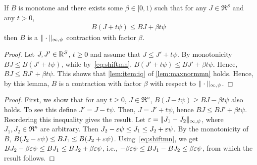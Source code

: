 \documentclass[12pt,draftcls,onecolumn]{IEEEtran}
\begin{document}
\begin{corollary}
\label{maxnormmn}
\label{cor:maxnormmn}
If $B$ is monotone and there exists some $\beta\in [0,1)$ such that for any $J\in \Re^S$ and any $t>0$,
\begin{align}
\label{eq:shiftmn}
B( J + t \psi) \le B J + \beta t \psi
\end{align}
then $B$ is a $\|\cdot\|_{\infty,\psi}$ contraction with factor $\beta$.
\end{corollary}
\begin{proof}
Let $J,J'\in \mathbb{R}^S$, $t\ge 0$ and assume that $J\le J' + t \psi$. By monotonicity $BJ \le B(J'+ t \psi)$, while
by~\eqref{eq:shiftmn}, $B(J'+t\psi) \le BJ' + \beta t \psi$. Hence, $BJ \le BJ' + \beta t \psi$.
This shows that \eqref{lem:item:iq} of \cref{lem:maxnormmn} holds.
Hence, by this lemma, $B$ is a contraction with factor $\beta$ with respect to $\|\cdot\|_{\infty,\psi}$.
\end{proof}
\begin{proof}
First, we show that for any $t\ge 0$,  $J\in \Re^n$,
$B( J - t \psi) \ge B J - \beta t \psi$ also holds.
To see this define $J' = J-t\psi$. Then, $J = J'+t\psi$, hence $B J \le B J' + \beta t \psi$. Reordering this inequality gives the result.
Let $\varepsilon = \|J_1 - J_2\|_{\infty,\psi}$, where $J_1,J_2\in \Re^n$ are arbitrary.
Then $J_2 - \varepsilon \psi \le J_1 \le J_2 + \varepsilon \psi$.
By the monotonicity of $B$,
$B(J_2 - \varepsilon \psi) \le B J_1 \le B(J_2 + \varepsilon \psi)$.
Using~\eqref{eq:shiftmn}, we get
$B J_2 - \beta \varepsilon \psi \le B J_1 \le B J_2 + \beta \varepsilon \psi$, i.e., $-\beta \varepsilon \psi \le B J_1 - B J_2 \le \beta \varepsilon \psi$, from which the result follows.
\end{proof}
\fi
\end{document}
